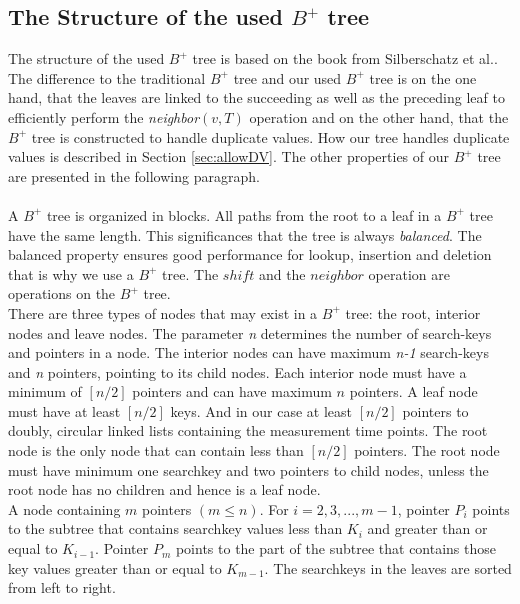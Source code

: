 \documentclass[abstracton,12pt]{scrreprt}
\begin{document}
\subsection{The Structure of the used $B^+$ tree}
\label{structureBtree}
The structure of the used $B^+$ tree is based on the book from Silberschatz et al.\cite{DatabaseSystemC}. \\
The difference to the traditional $B^+$ tree and our used $B^+$ tree is on the one hand, that the leaves are linked to the succeeding as well as the preceding leaf to efficiently perform the \emph{neighbor}$(v,T)$ operation and on the other hand, that the $B^+$ tree is constructed to handle duplicate values. How our tree handles duplicate values is described in Section \ref{sec:allowDV}. The other properties of our $B^+$ tree are presented in the following paragraph.\\ \\
A $B^+$ tree is organized in blocks. All paths from the root to a leaf in a $B^+$ tree have the same length. This significances that the tree is always \emph{balanced}. The balanced property ensures good performance for lookup, insertion and deletion that is why we use a $B^+$ tree. The $shift$ and the $neighbor$ operation are operations on the $B^+$ tree.\\There are three types of nodes that may exist in a $B^+$ tree: the root, interior nodes and leave nodes. The parameter \emph{n} determines the number of search-keys and pointers in a node. The interior nodes can have maximum \emph{n-1} search-keys and \emph{n} pointers, pointing to its child nodes. Each interior node must have a minimum of $[n/2]$ pointers and can have maximum $n$ pointers. A leaf node must have at least $[n/2]$ keys. And in our case at least $[n/2]$ pointers to doubly, circular linked lists containing the measurement time points. The root node is the only node that can contain less than $[n/2]$ pointers. The root node must have minimum one searchkey and two pointers to child nodes, unless the root node has no children and hence is a leaf node.\\ 
A node containing $m$ pointers $\left(m \leq n\right)$. For $i = 2, 3, . . . ,m-1$, pointer $P_i$ points to the subtree that contains searchkey values less than $K_i$ and greater than or equal to $K_{i-1}$. Pointer $P_m$ points to the part of the subtree that contains those key values greater than or equal to $K_{m-1}$. The searchkeys in the leaves are sorted from left to right. 
\end{document}
